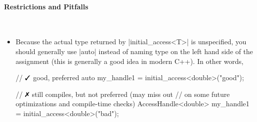 \paragraph{Restrictions and Pitfalls}\mbox{}\\ 
\begin{itemize}
  \item Because the actual type returned by |initial_access<T>| is
  unspecified, you should generally use |auto| instead of naming type on 
  the left hand side of the assignment (this is generally a good idea in modern
  C++). In other words,
  \begin{CppCode}
	// $\yes$ good, preferred
	auto my_handle1 = initial_access<double>("good"); 

	// $\no$ still compiles, but not preferred (may miss out
	//  on some future optimizations and compile-time checks)
	AccessHandle<double> my_handle1 = initial_access<double>("bad"); 
  \end{CppCode}
\end{itemize}



